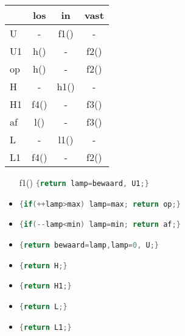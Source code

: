 \documentclass[a4paper, 11pt, fleqn, twoside]{scrartcl}%
\begin{document}
\begin{minipage}{0.35\textwidth}
\hspace{2em}\begin{tabular}{|l|c|c|c|}\hline
   & los  & in   & vast \\ \hline%
 U & -    & f1() &-     \\ %
 U1& h()  & -    & f2() \\ %
 op& h()  & -    & f2() \\ \hline
 H & -    & h1() & -    \\ %
 H1& f4() & -    & f3() \\ %
 af& l()  & -    & f3() \\ \hline
 L & -    & l1() & -    \\ %
 L1& f4() & -    & f2() \\ \hline
\end{tabular}
\end{minipage}
\begin{minipage}{0.6\textwidth}\begin{itemize}
\item[f1()] \lstinline[language=C]${return lamp=bewaard, U1;}$
\item[f2()] \lstinline[language=C]${if(++lamp>max) lamp=max; return op;}$
\item[f3()] \lstinline[language=C]${if(--lamp<min) lamp=min; return af;}$
\item[f4()] \lstinline[language=C]${return bewaard=lamp,lamp=0, U;}$
\item[h()]  \lstinline[language=C]${return H;}$
\item[h1()] \lstinline[language=C]${return H1;}$
\item[l()]  \lstinline[language=C]${return L;}$
\item[l1()] \lstinline[language=C]${return L1;}$
\end{itemize}
\end{minipage}

\end{document}
